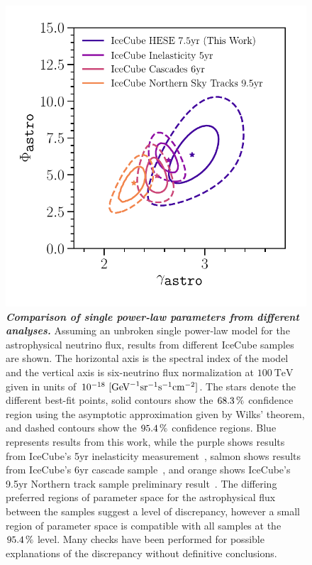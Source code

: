 \begin{figure}
	\centering
	\includegraphics[width=\linewidth]{figures/hese_paper/spl_freq_scan}
	\internallinenumbers
	\caption{\textbf{\textit{Comparison of single power-law parameters from different analyses.}} Assuming an unbroken single power-law model for the astrophysical neutrino flux, results from different IceCube samples are shown.
		The horizontal axis is the spectral index of the model and the vertical axis is six-neutrino flux normalization at $\SI{100}\TeV$ given in units of $10^{-18}~[\textmd{GeV}^{-1} \textmd{sr}^{-1} \textmd{s}^{-1} \textmd{cm}^{-2}]$.
		The stars denote the different best-fit points, solid contours show the $\SI{68.3}\percent$ confidence region using the asymptotic approximation given by Wilks' theorem, and dashed contours show the $\SI{95.4}\percent$ confidence regions.
		Blue represents results from this work, while the purple shows results from IceCube's 5yr inelasticity measurement~\cite{Aartsen:2018vez}, salmon shows results from IceCube’s 6yr cascade sample~\cite{hansthesis}, and orange shows IceCube’s 9.5yr Northern track sample preliminary result~\cite{Stettner:2019tok}.
		The differing preferred regions of parameter space for the astrophysical flux between the samples suggest a level of discrepancy, however a small region of parameter space is compatible with all samples at the $\SI{95.4}\percent$ level.
		Many checks have been performed for possible explanations of the discrepancy without definitive conclusions.}\label{fig:SPL_frequentist}
\end{figure}

